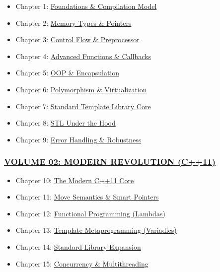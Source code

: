 \begin{itemize}
\tightlist
\item
  Chapter 1:
  \protect\hyperlink{chapter-1-foundations-and-compilation}{Foundations
  \& Compilation Model}
\item
  Chapter 2:
  \protect\hyperlink{chapter-2-memory-types-and-pointers}{Memory Types
  \& Pointers}
\item
  Chapter 3:
  \protect\hyperlink{chapter-3-control-flow-and-preprocessor}{Control
  Flow \& Preprocessor}
\item
  Chapter 4:
  \protect\hyperlink{chapter-4-advanced-functions-and-callbacks}{Advanced
  Functions \& Callbacks}
\item
  Chapter 5: \protect\hyperlink{chapter-5-oop-and-encapsulation}{OOP \&
  Encapsulation}
\item
  Chapter 6:
  \protect\hyperlink{chapter-6-polymorphism-and-virtualization}{Polymorphism
  \& Virtualization}
\item
  Chapter 7:
  \protect\hyperlink{chapter-7-standard-template-library-core}{Standard
  Template Library Core}
\item
  Chapter 8: \protect\hyperlink{chapter-8-stl-under-the-hood}{STL Under
  the Hood}
\item
  Chapter 9:
  \protect\hyperlink{chapter-9-error-handling-and-robustness}{Error
  Handling \& Robustness}
\end{itemize}

\hypertarget{volume-02-modern-revolution-c11}{%
\subsubsection{\texorpdfstring{\protect\hyperlink{volume-02-modern-revolution-c11}{VOLUME
02: MODERN REVOLUTION
(C++11)}}{VOLUME 02: MODERN REVOLUTION (C++11)}}\label{volume-02-modern-revolution-c11}}

\begin{itemize}
\tightlist
\item
  Chapter 10: \protect\hyperlink{chapter-10-the-modern-c11-core}{The
  Modern C++11 Core}
\item
  Chapter 11:
  \protect\hyperlink{chapter-11-move-semantics-and-smart-pointers}{Move
  Semantics \& Smart Pointers}
\item
  Chapter 12:
  \protect\hyperlink{chapter-12-functional-programming}{Functional
  Programming (Lambdas)}
\item
  Chapter 13:
  \protect\hyperlink{chapter-13-template-metaprogramming}{Template
  Metaprogramming (Variadics)}
\item
  Chapter 14:
  \protect\hyperlink{chapter-14-standard-library-expansion}{Standard
  Library Expansion}
\item
  Chapter 15: \protect\hyperlink{chapter-15-concurrency}{Concurrency \&
  Multithreading}
\end{itemize}

